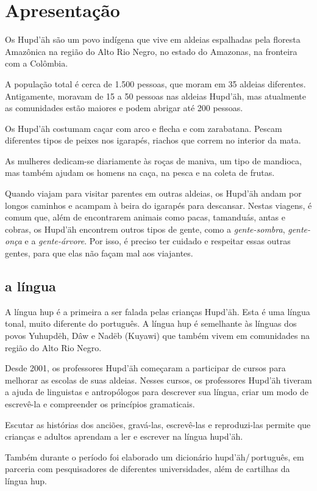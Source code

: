 \chapter{Apresentação}

Os Hupd’äh são um povo indígena que vive em aldeias espalhadas pela floresta Amazônica na região do Alto Rio Negro, no estado do Amazonas, na fronteira com a Colômbia.

A população total é cerca de 1.500 pessoas, que moram em 35 aldeias diferentes. Antigamente, moravam de 15 a 50 pessoas nas aldeias Hupd’äh, mas atualmente as comunidades estão maiores e podem abrigar até 200 pessoas.

Os Hupd’äh costumam caçar com arco e flecha e com zarabatana. Pescam diferentes tipos de peixes nos igarapés, riachos que correm no interior da mata.

As mulheres dedicam-se diariamente às roças de maniva, um tipo de mandioca, mas também ajudam os homens na caça, na pesca e na coleta de frutas.

Quando viajam para visitar parentes em outras aldeias, os Hupd’äh andam por longos caminhos e acampam à beira do igarapés para descansar. Nestas viagens, é comum que, além de encontrarem animais como pacas, tamanduás, antas e cobras, os Hupd’äh encontrem outros tipos de gente, como a \textit{gente-sombra}, \textit{gente-onça} e a \textit{gente-árvore}. Por isso, é preciso ter cuidado e respeitar essas outras gentes, para que elas não façam mal aos viajantes.

\section{a língua}

A língua hup é a primeira a ser falada pelas crianças Hupd’äh. Esta é uma língua tonal, muito
diferente do português. A língua hup é semelhante às línguas dos povos Yuhupdëh,
Dâw e Nadëb (Kuyawi) que também vivem em comunidades na região do Alto Rio Negro.

Desde 2001, os professores Hupd’äh começaram a participar de cursos para melhorar as
escolas de suas aldeias. Nesses cursos, os professores Hupd’äh tiveram a ajuda de linguistas e antropólogos para descrever sua língua, criar um modo de escrevê-la e compreender os princípios gramaticais.

Escutar as histórias dos anciões, gravá-las, escrevê-las e reproduzi-las permite que
crianças e adultos aprendam a ler e escrever na língua hupd’äh.

Também durante o período foi elaborado um dicionário hupd’äh/\,português, em parceria
com pesquisadores de diferentes universidades, além de cartilhas da língua hup.